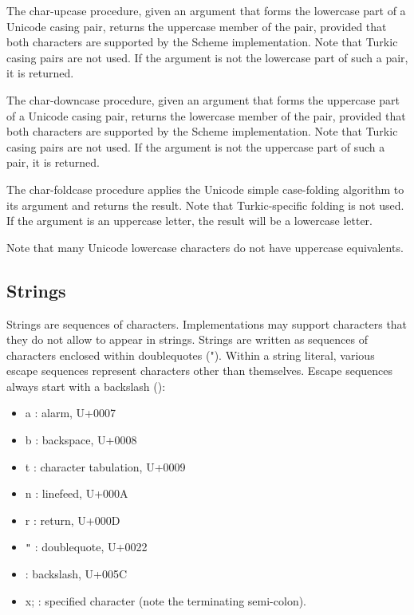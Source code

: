 \begin{entry}{%
}


The {\cf char-upcase} procedure, given an argument that forms the
lowercase part of a Unicode casing pair, returns the uppercase member
of the pair, provided that both characters are supported by the Scheme
implementation.  Note that Turkic casing pairs are not used.  If the
argument is not the lowercase part of such a pair, it is returned.

The {\cf char-downcase} procedure, given an argument that forms the
uppercase part of a Unicode casing pair, returns the lowercase member
of the pair, provided that both characters are supported by the Scheme
implementation.  Note that Turkic casing pairs are not used.  If the
argument is not the uppercase part of such a pair, it is returned.

The {\cf char-foldcase} procedure applies the Unicode simple
case-folding algorithm to its argument and returns the result.  Note that
Turkic-specific folding is not used.  If the argument is an uppercase
letter, the result will be a lowercase letter.

Note that many Unicode lowercase characters do not have uppercase
equivalents.

\end{entry}


\subsection{Strings}
\label{stringsection}

Strings are sequences of characters.  
Implementations may support characters that they do not allow to appear
in strings.
\vest Strings are written as sequences of characters enclosed within doublequotes
({\cf "}).  Within a string literal, various escape
sequences represent characters other than
themselves.  Escape sequences always start with a backslash (\backwhack{}):

\begin{itemize}
\item{\cf\backwhack{}a} : alarm, U+0007
\item{\cf\backwhack{}b} : backspace, U+0008 
\item{\cf\backwhack{}t} : character tabulation, U+0009 
\item{\cf\backwhack{}n} : linefeed, U+000A 
\item{\cf\backwhack{}r} : return, U+000D 
\item{\cf\backwhack{}}\verb|"| : doublequote, U+0022 
\item{\cf\backwhack{}\backwhack{}} : backslash, U+005C 
\item{\cf\backwhack{}x;} : specified character (note the
  terminating semi-colon).
\end{itemize}

